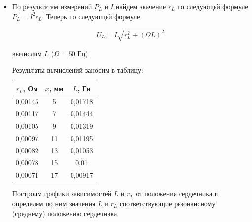 \documentclass[a4paper, 12pt]{article}%
\begin{document}
\begin{itemize}

\item По результатам измерений $P_L$ и $I$ найдем значение $r_L$ по следующей формуле $P_L = I^2r_L $. Теперь по следующей формуле 

\begin{equation}
U_L = I \sqrt{r_L^2 + (\Omega L)^2}
\end{equation}

вычислим $L$ ($\Omega = 50$ Гц).

Результаты вычислений заносим в таблицу:


\begin{table}[!h]
\begin{center}
\begin{tabular}{|c|c|c|}
\hline $r_L$, Ом & $x$, мм & $L$, Гн\\
\hline 0,00145 & 5 & 0,01718 \\
\hline 0,00117 & 7 & 0,01444 \\
\hline 0,00105 & 9 & 0,01319 \\
\hline 0,00097 & 11 & 0,01195 \\
\hline 0,00082 & 13 & 0,01053 \\
\hline 0,00078 & 15 & 0,01 \\
\hline 0,00071 & 17 & 0,00917 \\
\hline
\end{tabular}
\end{center} 
\end{table}


Построим графики зависимостей $L$ и $r_L$ от положения сердечника и определем по ним значения $L$ и 
$r_L$ соответствующие резонансному (среднему) положению сердечника.

\newpage

\begin{center}

\begin{figure}[h]
\end{figure}


\end{center}
\end{itemize}
\end{document}
